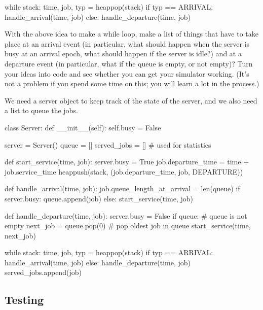   \begin{pyverbatim}
while stack:
    time, job, typ = heappop(stack)
    if typ == ARRIVAL:
        handle_arrival(time, job)
    else:
        handle_departure(time, job)
    
  \end{pyverbatim}

\begin{exercise}
  With the above idea to make a while loop, make a list of things that have to take place at an arrival event (in particular, what should happen when the server is busy at an arrival epoch, what should happen if the server is idle?)
  and at a departure event (in particular, what if the queue is empty, or not empty)?
  Turn your ideas into code and see whether you can get your simulator working.
  (It's not a problem if you spend some time on this; you will learn a lot in the process.)

\begin{solution}
We need a server object to keep track of the state of the server, and we also need  a list to queue the jobs. 

  \begin{pyverbatim}
class Server:
    def __init__(self):
        self.busy = False

server = Server()
queue = []
served_jobs = [] # used for statistics

def start_service(time, job):
    server.busy = True
    job.departure_time = time + job.service_time
    heappush(stack, (job.departure_time, job, DEPARTURE))

def handle_arrival(time, job):
    job.queue_length_at_arrival = len(queue)
    if server.busy:
        queue.append(job)
    else:
        start_service(time, job)
        
def handle_departure(time, job):
    server.busy = False
    if queue: # queue is not empty
        next_job = queue.pop(0) # pop oldest job in queue
        start_service(time, next_job)
        
while stack:
    time, job, typ = heappop(stack)
    if typ == ARRIVAL:
        handle_arrival(time, job)
    else:
        handle_departure(time, job)
        served_jobs.append(job)

  \end{pyverbatim}
\end{solution}

\end{exercise}

\subsection{Testing}
\label{sec:testing}

